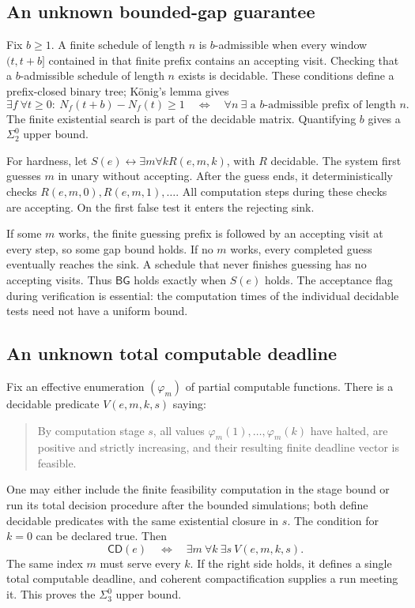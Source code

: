 \documentclass[11pt,letterpaper]{article}
\theoremstyle{definition}
\theoremstyle{remark}
\newcommand{\sig}[1]{\Sigma^{0}_{#1}}
\newcommand{\Clock}{\mathsf{CD}}
\newcommand{\Gap}{\mathsf{BG}}
\newcommand{\1}{\mathbf 1}
\begin{document}
\subsection{An unknown bounded-gap guarantee}
Fix $b\ge1$. A finite schedule of length $n$ is $b$-admissible when every
window $(t,t+b]$ contained in that finite prefix contains an accepting
visit. Checking that a $b$-admissible schedule of length $n$ exists is
decidable. These conditions define a prefix-closed binary tree; K\"onig's
lemma gives
\[
 \exists f\ \forall t\ge0:\ N_f(t+b)-N_f(t)\ge1
 \quad\Longleftrightarrow\quad
 \forall n\ \exists\text{ a $b$-admissible prefix of length }n.
\]
The finite existential search is part of the decidable matrix. Quantifying
$b$ gives a $\sig2$ upper bound.

For hardness, let $S(e)\leftrightarrow\exists m\forall k R(e,m,k)$, with
$R$ decidable. The system first guesses $m$ in unary without accepting.
After the guess ends, it deterministically checks
$R(e,m,0),R(e,m,1),\ldots$. All computation steps during these checks are
accepting. On the first false test it enters the rejecting sink.

If some $m$ works, the finite guessing prefix is followed by an accepting
visit at every step, so some gap bound holds. If no $m$ works, every completed
guess eventually reaches the sink. A schedule that never finishes guessing
has no accepting visits. Thus $\Gap$ holds exactly when $S(e)$ holds.
The acceptance flag during verification is essential: the computation times
of the individual decidable tests need not have a uniform bound.

\subsection{An unknown total computable deadline}
Fix an effective enumeration $(\varphi_m)$ of partial computable functions.
There is a decidable predicate $V(e,m,k,s)$ saying:
\begin{quote}
By computation stage $s$, all values $\varphi_m(1),\ldots,\varphi_m(k)$
have halted, are positive and strictly increasing, and their resulting
finite deadline vector is feasible.
\end{quote}
One may either include the finite feasibility computation in the stage bound
or run its total decision procedure after the bounded simulations; both
define decidable predicates with the same existential closure in $s$.
The condition for $k=0$ can be declared true. Then
\begin{equation}\label{lbh:eq:CDsigma3}
 \Clock(e)\quad\Longleftrightarrow\quad
 \exists m\ \forall k\ \exists s\ V(e,m,k,s).
\end{equation}
The same index $m$ must serve every $k$. If the right side holds, it defines
a single total computable deadline, and coherent compactification supplies
a run meeting it. This proves the $\sig3$ upper bound.
\end{document}
